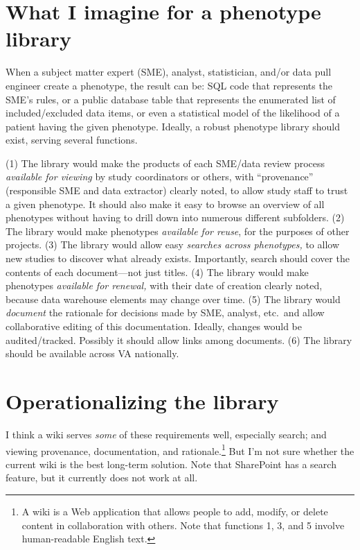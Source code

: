 \documentclass{tufte-handout}
\begin{document}
\section{What I imagine for a phenotype library}

When a subject matter expert (SME), analyst, statistician, and/or data
pull engineer create a phenotype, the result can be: SQL code that
represents the SME's rules, or a public database table that represents
the enumerated list of included/excluded data items, or even a
statistical model of the likelihood of a patient having the given
phenotype. Ideally, a robust phenotype library should exist, serving
several functions.

(1) The library would make the products of each SME/data review
process \emph{available for viewing} by study coordinators or others,
with ``provenance'' (responsible SME and data extractor) clearly
noted, to allow study staff to trust a given phenotype. It should also
make it easy to browse an overview of all phenotypes without having to
drill down into numerous different subfolders. (2) The library would
make phenotypes \emph{available for reuse}, for the purposes of other
projects. (3) The library would allow easy \emph{searches across
  phenotypes,} to allow new studies to discover what already exists.
Importantly, search should cover the contents of each document---not
just titles. (4) The library would make phenotypes \emph{available for
  renewal,} with their date of creation clearly noted, because data
warehouse elements may change over time. (5) The library would
\emph{document} the rationale for decisions made by SME, analyst,
etc.\ and allow collaborative editing of this documentation. Ideally,
changes would be audited/tracked. Possibly it should allow links among
documents. (6) The library should be available across VA nationally.

\section{Operationalizing the library}

I think a wiki serves \emph{some} of these requirements well,
especially search; and viewing provenance, documentation, and
rationale.\footnote{A wiki is a Web application that allows people to
  add, modify, or delete content in collaboration with others. Note
  that functions 1, 3, and 5 involve human-readable English text.} But
I'm not sure whether the current wiki is the best long-term solution.
Note that SharePoint has a search feature, but it currently does not
work at all.
\end{document}
